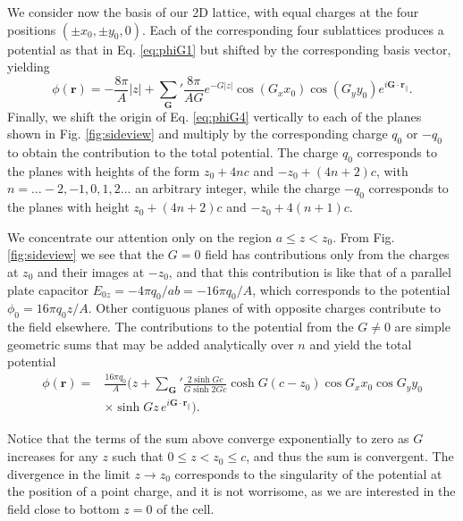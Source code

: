 \documentclass{article}
\newcommand{\abs}[1]{\lvert#1\rvert}
\begin{document}
We consider now the basis of our 2D lattice, with equal charges at the
four positions $(\pm x_0, \pm y_0,0)$. Each of the corresponding four
sublattices produces a potential as that in Eq. \eqref{eq:phiG1} but
shifted by the corresponding basis vector, yielding
\begin{equation}
  \label{eq:phiG4}
  \phi(\bm r) = -\frac{8\pi}{A} \abs{z}
    +{\sum_{\bm G}}' \frac{8\pi}{AG} e^{- G \abs{z}}\cos(G_x x_0)
    \cos(G_y y_0) e^{i \bm G\cdot\bm r_\|}.
\end{equation}
Finally, we shift the origin of Eq. \eqref{eq:phiG4} vertically to each of the planes shown in
Fig. \ref{fig:sideview} and multiply by the corresponding charge $q_0$
or $-q_0$ to obtain the contribution to the total potential. The charge $q_0$ corresponds to
the planes with heights of the form $z_0+4nc$ and $-z_0+(4n+2)c$, with
$n=\ldots-2,-1,0,1,2\ldots$ an arbitrary integer, while the charge
$-q_0$ corresponds to the planes with height $z_0+(4n+2)c$ and
$-z_0+4(n+1)c$.

We concentrate our attention only on the region $a\le z<z_0$. From
Fig. \ref{fig:sideview} we see that the $G=0$
field has contributions only from the charges at $z_0$ and their
images at $-z_0$, and that this contribution is like that of a parallel plate
capacitor $E_{0z}=-4\pi q_0/ab=-16\pi q_0/A$, which corresponds to the
potential $\phi_0=16\pi q_0 z/A$. Other contiguous planes of with opposite charges
contribute to the field elsewhere. The contributions to the potential
from the $G\ne0$ are simple geometric sums that may be added
analytically over $n$ and yield the total potential
\begin{equation}
  \label{eq:phitot}
  \begin{split}
    \phi(\bm r)=&\frac{16\pi q_0}{A}\biggl(z+{\sum_{\bm G}}'\frac{2\sinh
      Gc}{G \sinh 2Gc}\cosh G(c-z_0)\cos G_x x_0 \cos G_y y_0\\
    &\times \sinh Gz\, e^{i\bm G\cdot\bm r_\|}\biggr).
  \end{split}
\end{equation}

Notice that the terms of the sum above converge exponentially to zero
as $G$ increases for any $z$ such that $0\le z <z_0 \le c$, and thus
the sum is convergent. The divergence in the limit $ z
\longrightarrow z_0 $ corresponds to the singularity of the potential
at the position of a point charge, and it is not worrisome, as we are
interested in the field close to bottom $z=0$ of the cell.
\end{document}
